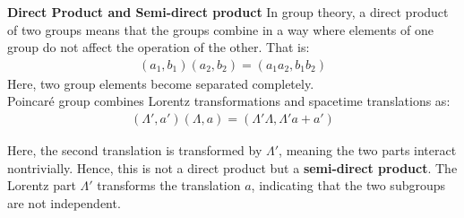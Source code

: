 \documentclass[14pt]{article} %
\begin{document}
\vspace{-0.5cm}
\begin{tcolorbox}[ title=\textbf{Note:}]
\textbf{Direct Product and Semi-direct product}
\newline
In group theory, a direct product of two groups means that the groups combine in a way where elements of one group do not affect the operation of the other. That is:
\begin{align*}
(a_1, b_1)(a_2, b_2) = (a_1 a_2, b_1 b_2)
\end{align*}
Here, two group elements become separated completely.\\
Poincaré group combines Lorentz transformations and spacetime translations as:
\begin{align*}
(\Lambda', a')(\Lambda, a) = (\Lambda'\Lambda, \Lambda'a + a')
\end{align*}

Here, the second translation is transformed by $\Lambda'$, meaning the two parts interact nontrivially. Hence, this is not a direct product but a \textbf{semi-direct product}. The Lorentz part $\Lambda'$ transforms the translation $a$, indicating that the two subgroups are not independent.
\end{tcolorbox}
\vspace{-0.7cm}
\end{document}
